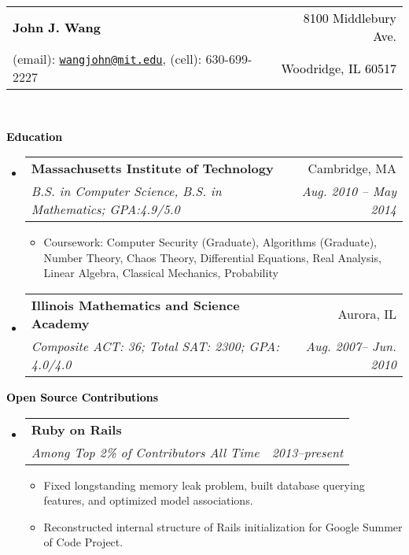 \documentclass[letterpaper,11pt]{article}
\makeatletter
\newcommand{\resitem}[1]{\item #1 \vspace{-2pt}}
\newcommand{\resheading}[1]{{\large \colorbox{mygrey}{\begin{minipage}{\textwidth}{\textbf{ \textcolor{Black}{#1 \vphantom{p\^{E}}}}}\end{minipage}}}}
\newcommand{\ressubheading}[4]{
\begin{tabular*}{6.5in}{l@{\extracolsep{\fill}}r}
		\textbf{#1} & #2 \\
		\textit{#3} & \textit{#4} \\
\end{tabular*}\vspace{-6pt}}
\makeatother
\begin{document}
\newcommand{\myheader}{
\begin{tabular*}{7in}{l@{\extracolsep{\fill}}r}
	\textbf{\huge {\textcolor{Black}{John J. Wang}}} & \textcolor{Black}{8100 Middlebury Ave.}\\
	{\footnotesize (email): \texttt{{\href{mailto:wangjohn@mit.edu}{wangjohn@mit.edu}}},  (cell): 630-699-2227} & \textcolor{Black}{Woodridge, IL 60517} 
	\end{tabular*}
\\
\vspace{0.1in}}

\myheader

\resheading{Education}
	\begin{itemize}
		\item
			\ressubheading{Massachusetts Institute of Technology}{Cambridge, MA}{{B.S. in Computer Science, B.S. in Mathematics};{ GPA:4.9/5.0}}{Aug. 2010 -- May 2014}
				{ \footnotesize
				\begin{itemize}
					\resitem{Coursework: Computer Security (Graduate), Algorithms (Graduate), Number Theory, Chaos Theory, Differential Equations,  Real Analysis, Linear Algebra, Classical Mechanics, Probability} 
				\end{itemize}
				}
		\item			
			\ressubheading{Illinois Mathematics and Science Academy}{Aurora, IL}{{Composite ACT: 36}; {Total SAT: 2300}; {GPA: 4.0/4.0}}{Aug. 2007-- Jun. 2010} {\footnotesize

				}
			
	\end{itemize} %

\resheading{Open Source Contributions}
	\begin{itemize}
		\item
			\ressubheading{Ruby on Rails}{}{{Among Top 2\% of Contributors All Time}}{2013--present}
			{\footnotesize
				\begin{itemize}
					\resitem {Fixed longstanding memory leak problem, built database querying features, and optimized model associations.}
					\resitem {Reconstructed internal structure of Rails initialization for Google Summer of Code Project.}
				\end{itemize}
			}
	\end{itemize}
\end{document}
